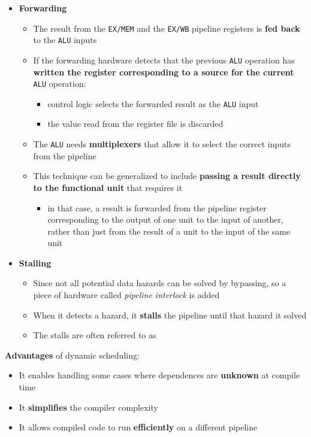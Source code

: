 \documentclass[english]{article}
\begin{document}
\begin{itemize}
  \item \textbf{Forwarding}
        \begin{itemize}
          \item The result from the \texttt{EX/MEM} and the \texttt{EX/WB} pipeline registers is \textbf{fed back} to the \texttt{ALU} inputs
          \item If the forwarding hardware detects that the previous \texttt{ALU} operation has \textbf{written the register corresponding to a source for the current} \texttt{ALU} operation:
                \begin{itemize}
                  \item control logic selects the forwarded result as the \texttt{ALU} input
                  \item the value read from the register file is discarded
                \end{itemize}
          \item The \texttt{ALU} needs \textbf{multiplexers} that allow it to select the correct inputs from the pipeline
          \item This technique can be generalized to include \textbf{passing a result directly to the functional unit} that requires it
                \begin{itemize}
                  \item in that case, a result is forwarded from the pipeline register corresponding to the output of one unit to the input of another, rather than just from the result of a unit to the input of the same unit
                \end{itemize}
        \end{itemize}
  \item \textbf{Stalling}
        \begin{itemize}
          \item Since not all potential data hazards can be solved by bypassing, so a piece of hardware called \textit{pipeline interlock} is added
          \item When it detects a hazard, it \textbf{stalls} the pipeline until that hazard it solved
          \item The stalls are often referred to as 
        \end{itemize}
\end{itemize}

\bigskip
\textbf{Advantages} of dynamic scheduling:
\begin{itemize}
  \item It enables handling some cases where dependences are \textbf{unknown} at compile time
  \item It \textbf{simplifies} the compiler complexity
  \item It allows compiled code to run \textbf{efficiently} on a different pipeline
\end{itemize}
\end{document}
